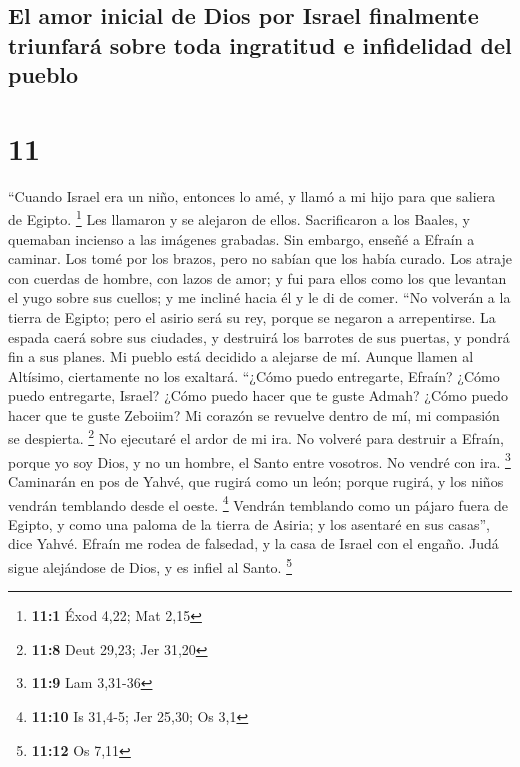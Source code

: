 \hypertarget{el-amor-inicial-de-dios-por-israel-finalmente-triunfaruxe1-sobre-toda-ingratitud-e-infidelidad-del-pueblo}{%
\subsection{El amor inicial de Dios por Israel finalmente triunfará
sobre toda ingratitud e infidelidad del
pueblo}\label{el-amor-inicial-de-dios-por-israel-finalmente-triunfaruxe1-sobre-toda-ingratitud-e-infidelidad-del-pueblo}}

\hypertarget{section-10}{%
\section{11}\label{section-10}}

 ``Cuando Israel era un niño, entonces lo amé, y llamó a
mi hijo para que saliera de Egipto. \footnote{\textbf{11:1} Éxod 4,22;
  Mat 2,15}  Les llamaron y se alejaron de ellos.
Sacrificaron a los Baales, y quemaban incienso a las imágenes grabadas.
 Sin embargo, enseñé a Efraín a caminar. Los tomé por los
brazos, pero no sabían que los había curado.  Los atraje
con cuerdas de hombre, con lazos de amor; y fui para ellos como los que
levantan el yugo sobre sus cuellos; y me incliné hacia él y le di de
comer.  ``No volverán a la tierra de Egipto; pero el
asirio será su rey, porque se negaron a arrepentirse.  La
espada caerá sobre sus ciudades, y destruirá los barrotes de sus
puertas, y pondrá fin a sus planes.  Mi pueblo está
decidido a alejarse de mí. Aunque llamen al Altísimo, ciertamente no los
exaltará.  ``¿Cómo puedo entregarte, Efraín? ¿Cómo puedo
entregarte, Israel? ¿Cómo puedo hacer que te guste Admah? ¿Cómo puedo
hacer que te guste Zeboiim? Mi corazón se revuelve dentro de mí, mi
compasión se despierta. \footnote{\textbf{11:8} Deut 29,23; Jer 31,20}
 No ejecutaré el ardor de mi ira. No volveré para destruir
a Efraín, porque yo soy Dios, y no un hombre, el Santo entre vosotros.
No vendré con ira. \footnote{\textbf{11:9} Lam 3,31-36} 
Caminarán en pos de Yahvé, que rugirá como un león; porque rugirá, y los
niños vendrán temblando desde el oeste. \footnote{\textbf{11:10} Is
  31,4-5; Jer 25,30; Os 3,1}  Vendrán temblando como un
pájaro fuera de Egipto, y como una paloma de la tierra de Asiria; y los
asentaré en sus casas'', dice Yahvé.  Efraín me rodea de
falsedad, y la casa de Israel con el engaño. Judá sigue alejándose de
Dios, y es infiel al Santo. \footnote{\textbf{11:12} Os 7,11}

